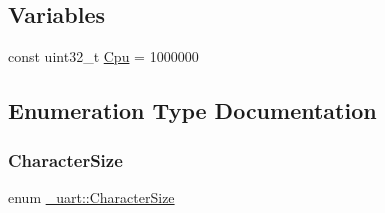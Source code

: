 \subsection*{Variables}
\begin{DoxyCompactItemize}
\item 
const uint32\+\_\+t \hyperlink{namespace__uart_adc722494a8735d82dccb72158d1a4165}{Cpu} = 1000000
\end{DoxyCompactItemize}


\subsection{Enumeration Type Documentation}
\hypertarget{namespace__uart_a6bcb12dc8982ef9737777dbfdbcce1e4}{}\label{namespace__uart_a6bcb12dc8982ef9737777dbfdbcce1e4} 
\subsubsection{\texorpdfstring{Character\+Size}{CharacterSize}}
{\footnotesize\ttfamily enum \hyperlink{namespace__uart_a6bcb12dc8982ef9737777dbfdbcce1e4}{\+\_\+uart\+::\+Character\+Size}}

